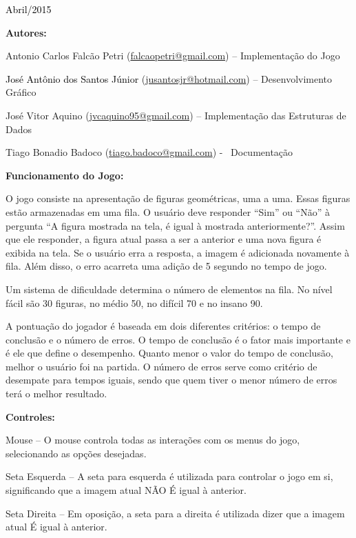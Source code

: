 \documentclass[a4paper]{article}
\begin{document}
{\centering
\textcolor{black}{Abril/2015}
\par}

\textbf{Autores:}

Antonio Carlos Falcão Petri
(\href{mailto:falcaopetri@gmail.com}{falcaopetri@gmail.com}) –
Implementação do Jogo

\textcolor{black}{José Antônio dos Santos Júnior}
(\href{mailto:jusantosjr@hotmail.com}{jusantosjr@hotmail.com}) –
Desenvolvimento Gráfico

José Vitor Aquino
(\href{mailto:jvcaquino95@gmail.com}{jvcaquino95@gmail.com}) –
Implementação das Estruturas de Dados

Tiago Bonadio Badoco
(\href{mailto:tiago.badoco@gmail.com}{tiago.badoco@gmail.com}) -
\ Documentação


\bigskip

\textbf{Funcionamento do Jogo:}

O jogo consiste na apresentação de figuras geométricas, uma a uma. Essas
figuras estão armazenadas em uma fila. O usuário deve responder “Sim”
ou “Não” à pergunta “A figura mostrada na tela, é igual à mostrada
anteriormente?”. Assim que ele responder, a figura atual passa a ser a
anterior e uma nova figura é exibida na tela. Se o usuário erra a
resposta, a imagem é adicionada novamente à fila. Além disso, o erro
acarreta uma adição de 5 segundo no tempo de jogo.

Um sistema de dificuldade determina o número de elementos na fila. No
nível fácil são 30 figuras, no médio 50, no difícil 70 e no insano 90.

A pontuação do jogador é baseada em dois diferentes critérios: o tempo
de conclusão e o número de erros. O tempo de conclusão é o fator mais
importante e é ele que define o desempenho. Quanto menor o valor do
tempo de conclusão, melhor o usuário foi na partida. O número de erros
serve como critério de desempate para tempos iguais, sendo que quem
tiver o menor número de erros terá o melhor resultado.


\bigskip

\textbf{Controles:}

Mouse – O mouse controla todas as interações com os menus do jogo,
selecionando as opções desejadas.

Seta Esquerda – A seta para esquerda é utilizada para controlar o jogo
em si, significando que a imagem atual NÃO É igual à anterior.

Seta Direita – Em oposição, a seta para a direita é utilizada dizer que
a imagem atual É igual à anterior.
\end{document}
